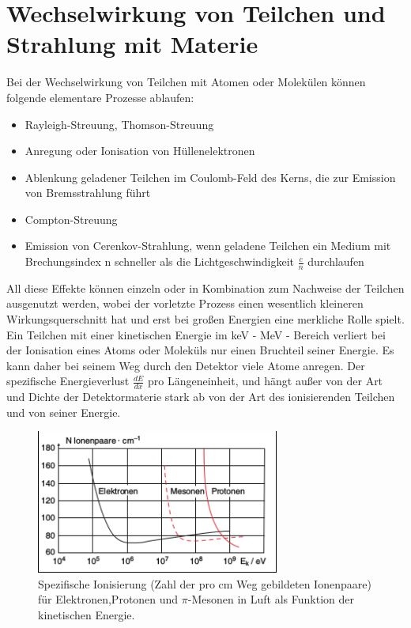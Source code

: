 \documentclass[Ex4_Zusammenfassung.tex]{subfiles}
\begin{document}
\chapter{Wechselwirkung von Teilchen und Strahlung mit Materie}
Bei der Wechselwirkung von Teilchen mit Atomen oder Molekülen können folgende elementare Prozesse ablaufen:
\begin{itemize}
\item Rayleigh-Streuung, Thomson-Streuung
\item Anregung oder Ionisation von Hüllenelektronen
\item Ablenkung geladener Teilchen im Coulomb-Feld des Kerns, die zur Emission von Bremsstrahlung führt
\item Compton-Streuung
\item Emission von Cerenkov-Strahlung, wenn geladene Teilchen ein Medium mit Brechungsindex n schneller als die Lichtgeschwindigkeit $\frac{c}{n}$ durchlaufen
\end{itemize}
All diese Effekte können einzeln oder in Kombination zum Nachweise der Teilchen ausgenutzt werden, wobei der vorletzte Prozess einen wesentlich kleineren Wirkungsquerschnitt hat und erst bei großen Energien eine merkliche Rolle spielt.
Ein Teilchen mit einer kinetischen Energie im keV - MeV - Bereich verliert bei der Ionisation eines Atoms oder Moleküls nur einen Bruchteil seiner Energie. Es kann daher bei seinem Weg durch den Detektor viele Atome anregen. Der spezifische Energieverlust $\frac{dE}{dx}$ pro Längeneinheit, und hängt außer von der Art und Dichte der Detektormaterie stark ab von der Art des ionisierenden Teilchen und von seiner Energie.
\begin{figure}[h]
\includegraphics[width=8cm]{Ionisationsplot.png}
\caption{Spezifische Ionisierung (Zahl der pro cm Weg gebildeten Ionenpaare) für Elektronen,Protonen und $\pi$-Mesonen in Luft als Funktion der kinetischen Energie.}
\end{figure}
\newpage
\end{document}
